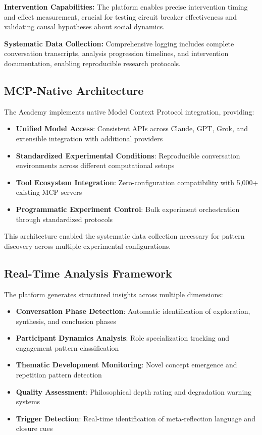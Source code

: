\documentclass[11pt,letterpaper]{article}
\newcommand{\theacademy}{The Academy}
\begin{document}
\textbf{Intervention Capabilities:} The platform enables precise intervention timing and effect measurement, crucial for testing circuit breaker effectiveness and validating causal hypotheses about social dynamics.

\textbf{Systematic Data Collection:} Comprehensive logging includes complete conversation transcripts, analysis progression timelines, and intervention documentation, enabling reproducible research protocols.

\subsection{MCP-Native Architecture}

\theacademy{} implements native Model Context Protocol integration, providing:

\begin{itemize}
    \item \textbf{Unified Model Access}: Consistent APIs across Claude, GPT, Grok, and extensible integration with additional providers
    \item \textbf{Standardized Experimental Conditions}: Reproducible conversation environments across different computational setups
    \item \textbf{Tool Ecosystem Integration}: Zero-configuration compatibility with 5,000+ existing MCP servers
    \item \textbf{Programmatic Experiment Control}: Bulk experiment orchestration through standardized protocols
\end{itemize}

This architecture enabled the systematic data collection necessary for pattern discovery across multiple experimental configurations.

\subsection{Real-Time Analysis Framework}

The platform generates structured insights across multiple dimensions:

\begin{itemize}
    \item \textbf{Conversation Phase Detection}: Automatic identification of exploration, synthesis, and conclusion phases
    \item \textbf{Participant Dynamics Analysis}: Role specialization tracking and engagement pattern classification
    \item \textbf{Thematic Development Monitoring}: Novel concept emergence and repetition pattern detection
    \item \textbf{Quality Assessment}: Philosophical depth rating and degradation warning systems
    \item \textbf{Trigger Detection}: Real-time identification of meta-reflection language and closure cues
\end{itemize}
\end{document}

